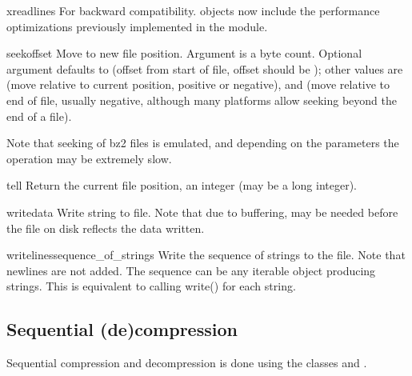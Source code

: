 \begin{methoddesc}[BZ2File]{xreadlines}{}
For backward compatibility.  objects now include the
performance optimizations previously implemented in the
 module.
\end{methoddesc}

\begin{methoddesc}[BZ2File]{seek}{offset}
Move to new file position. Argument  is a byte count. Optional
argument  defaults to  (offset from start of file,
offset should be ); other values are  (move relative to
current position, positive or negative), and  (move relative to end
of file, usually negative, although many platforms allow seeking beyond
the end of a file).

Note that seeking of bz2 files is emulated, and depending on the parameters
the operation may be extremely slow.
\end{methoddesc}

\begin{methoddesc}[BZ2File]{tell}{}
Return the current file position, an integer (may be a long integer).
\end{methoddesc}

\begin{methoddesc}[BZ2File]{write}{data}
Write string  to file. Note that due to buffering, 
may be needed before the file on disk reflects the data written.
\end{methoddesc}

\begin{methoddesc}[BZ2File]{writelines}{sequence_of_strings}
Write the sequence of strings to the file. Note that newlines are not added.
The sequence can be any iterable object producing strings. This is equivalent
to calling write() for each string.
\end{methoddesc}


\subsection{Sequential (de)compression}

Sequential compression and decompression is done using the classes
 and .


